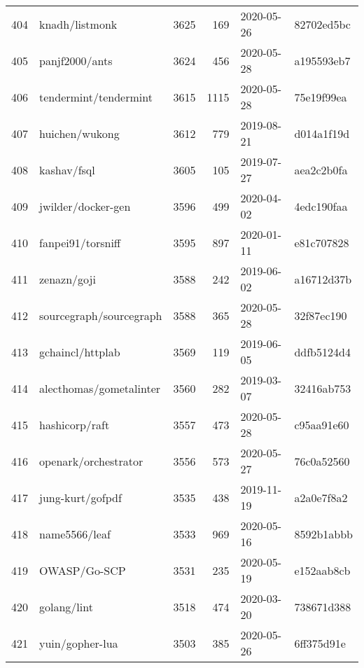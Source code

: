 \begin{longtable}{llrrll}
    404 &                                     knadh/listmonk &   3625 &    169 & 2020-05-26 &  82702ed5bc \\
    405 &                                     panjf2000/ants &   3624 &    456 & 2020-05-28 &  a195593eb7 \\
    406 &                              tendermint/tendermint &   3615 &   1115 & 2020-05-28 &  75e19f99ea \\
    407 &                                     huichen/wukong &   3612 &    779 & 2019-08-21 &  d014a1f19d \\
    408 &                                        kashav/fsql &   3605 &    105 & 2019-07-27 &  aea2c2b0fa \\
    409 &                                 jwilder/docker-gen &   3596 &    499 & 2020-04-02 &  4edc190faa \\
    410 &                                  fanpei91/torsniff &   3595 &    897 & 2020-01-11 &  e81c707828 \\
    411 &                                        zenazn/goji &   3588 &    242 & 2019-06-02 &  a16712d37b \\
    412 &                            sourcegraph/sourcegraph &   3588 &    365 & 2020-05-28 &  32f87ec190 \\
    413 &                                   gchaincl/httplab &   3569 &    119 & 2019-06-05 &  ddfb5124d4 \\
    414 &                            alecthomas/gometalinter &   3560 &    282 & 2019-03-07 &  32416ab753 \\
    415 &                                     hashicorp/raft &   3557 &    473 & 2020-05-28 &  c95aa91e60 \\
    416 &                               openark/orchestrator &   3556 &    573 & 2020-05-27 &  76c0a52560 \\
    417 &                                   jung-kurt/gofpdf &   3535 &    438 & 2019-11-19 &  a2a0e7f8a2 \\
    418 &                                      name5566/leaf &   3533 &    969 & 2020-05-16 &  8592b1abbb \\
    419 &                                       OWASP/Go-SCP &   3531 &    235 & 2020-05-19 &  e152aab8cb \\
    420 &                                        golang/lint &   3518 &    474 & 2020-03-20 &  738671d388 \\
    421 &                                    yuin/gopher-lua &   3503 &    385 & 2020-05-26 &  6ff375d91e \\

\end{longtable}
